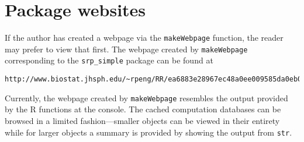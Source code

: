 \documentclass{article}
\newcommand{\proglang}{\textsf}
\newcommand{\code}{\texttt}
\newcommand{\pkg}{\textbf}
\begin{document}



\section{Package websites}

If the author has created a webpage via the \code{makeWebpage}
function, the reader may prefer to view that first.  The webpage
created by \code{makeWebpage} corresponding to the
\code{srp\_simple} package can be found at
\begin{verbatim}
http://www.biostat.jhsph.edu/~rpeng/RR/ea6883e28967ec48a0ee009585da0eb0/html/
\end{verbatim}
Currently, the webpage created by \code{makeWebpage} resembles the
output provided by the \proglang{R} functions at the console.  The
cached computation databases can be browsed in a limited
fashion---smaller objects can be viewed in their entirety while for
larger objects a summary is provided by showing the output from
\code{str}.







\end{document}
